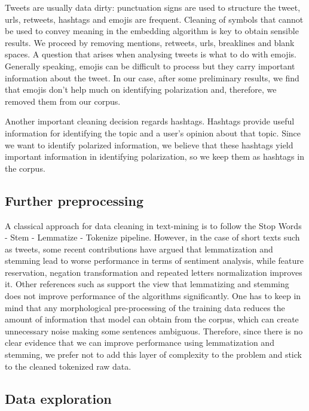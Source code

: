 \documentclass[12pt, authoryear]{elsarticle}
\begin{document}
Tweets are usually data dirty: punctuation signs are used to structure the tweet, urls, retweets, hashtags and emojis are frequent. Cleaning of symbols that cannot be used to convey meaning in the embedding algorithm is key to obtain sensible results. We proceed by removing mentions, retweets, urls, breaklines and  blank spaces. A question that arises when analysing tweets is what to do with emojis. Generally speaking, emojis can be difficult to process but they carry important information about the tweet. In our case, after some preliminary results, we find that emojis don't help much on identifying polarization and, therefore, we removed them from our corpus.

Another important cleaning decision regards hashtags. Hashtags provide useful information for identifying the topic and a user's opinion about that topic. Since we want to identify polarized information, we believe that these hashtags yield important information in identifying polarization, so we keep them as hashtags in the corpus.

\subsection{Further preprocessing}

A classical approach for data cleaning in text-mining is to follow the Stop Words - Stem - Lemmatize - Tokenize pipeline. However, in the case of short texts such as tweets, some recent contributions \cite{preprocessing} have argued that lemmatization and stemming lead to worse performance in terms of sentiment analysis, while feature reservation, negation transformation and repeated letters normalization improves it. Other references such as \cite{Hollink2004} support the view that lemmatizing and stemming does not improve performance of the algorithms significantly. One has to keep in mind that any morphological pre-processing of the training data reduces the amount of information that model can obtain from the corpus, which can create unnecessary noise making some sentences ambiguous. Therefore, since there is no clear evidence that we can improve performance using lemmatization and stemming, we prefer not to add this layer of complexity to the problem and stick to the cleaned tokenized raw data. 

\subsection{Data exploration}
    
\end{document}
